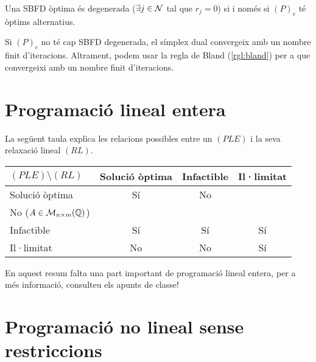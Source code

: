 \begin{prop}
    Una SBFD òptima és degenerada ($\exists j \in \mathcal{N}$ tal que $r_j = 0$) si i només si $\left(P\right)_e$ té òptims alternatius.
\end{prop}
\begin{prop}
    Si $\left(P\right)_e$ no té cap SBFD degenerada, el símplex dual convergeix amb un nombre finit d'iteracions. Altrament, podem usar la regla de Bland (\ref{rgl:bland}) per a que convergeixi amb un nombre finit d'iteracions.
\end{prop}

\section{Programació lineal entera}

\begin{propobs}
    La següent taula explica les relacions possibles entre un $\left(PLE\right)$ i la seva relaxació lineal $\left(RL\right)$.
    \begin{center}
        \begin{tabular}{|l|c|c|c|} \hline
            $\left(PLE\right) \setminus \left(RL\right)$ & Solució òptima & Infactible & Il·limitat \\ \hline
            Solució òptima & Sí & No & \thead{Sí ($A \in \mathcal{M}_{n\times m}(\real)$) \\ No ($A \in \mathcal{M}_{n\times m}(\mathbb{Q})$)} \\ \hline
            Infactible & Sí & Sí & Sí \\ \hline
            Il·limitat & No & No & Sí \\ \hline
        \end{tabular}
    \end{center}
\end{propobs}

En aquest resum falta una part important de programació lineal entera, per a més informació, consulteu els apunts de classe!

\section{Programaci\'o no lineal sense restriccions}

